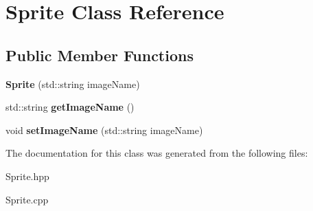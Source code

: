 \hypertarget{classSprite}{\section{Sprite Class Reference}
\label{classSprite}
}
\subsection*{Public Member Functions}
\begin{DoxyCompactItemize}
\item 
\hypertarget{classSprite_abedc19a9941b4b145287cccaddc0728b}{{\bfseries Sprite} (std\+::string image\+Name)}\label{classSprite_abedc19a9941b4b145287cccaddc0728b}

\item 
\hypertarget{classSprite_a6c94ce8f391cd77825929722a3402cdf}{std\+::string {\bfseries get\+Image\+Name} ()}\label{classSprite_a6c94ce8f391cd77825929722a3402cdf}

\item 
\hypertarget{classSprite_a7ac5eb186af630f55bbe52e22c62bc0d}{void {\bfseries set\+Image\+Name} (std\+::string image\+Name)}\label{classSprite_a7ac5eb186af630f55bbe52e22c62bc0d}

\end{DoxyCompactItemize}


The documentation for this class was generated from the following files\+:\begin{DoxyCompactItemize}
\item 
Sprite.\+hpp\item 
Sprite.\+cpp\end{DoxyCompactItemize}
